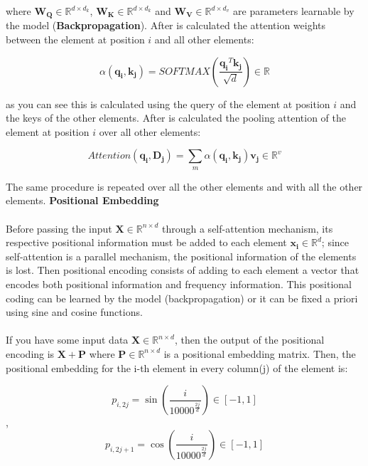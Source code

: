 where $\mathbf{W_{Q}} \in \mathbb{R}^{d \times d_{k}}$, $\mathbf{W_{K}} \in \mathbb{R}^{d \times d_{k}}$ and $\mathbf{W_{V}} \in \mathbb{R}^{d \times d_{v}}$ are parameters learnable by the model (\textbf{Backpropagation}). After is calculated the attention weights between the element at position $i$ and all other elements:

\begin{equation}
     \alpha (\mathbf{q_{i}},\mathbf{k_{j}})=SOFTMAX(\frac{\mathbf{q_{i}}^{T}\mathbf{k_{j}}}{\sqrt{d}}) \in \mathbb{R}
\end{equation}

as you can see this is calculated using the query of the element at position $i$ and the keys of the other elements. After is calculated the pooling attention of the element at position $i$ over all other elements:

\begin{equation}
    Attention(\mathbf{q_{i}},\mathbf{D_{j}})=\sum_{m} \alpha (\mathbf{q_{i}},\mathbf{k_{j}})\mathbf{v_{j}} \in \mathbb{R}^v
\end{equation}

The same procedure is repeated over all the other elements and with all the other elements.
\newpage
\textbf{Positional Embedding}
\\\\
Before passing the input $\mathbf{X} \in \mathbb{R}^{n \times d}$ through a self-attention mechanism, its respective positional information must be added to each element $\mathbf{x_{i}} \in \mathbb{R}^{d}$; since self-attention is a parallel mechanism, the positional information of the elements is lost. Then positional encoding consists of adding to each element a vector that encodes both positional information and frequency information. This positional coding can be learned by the model (backpropagation) or it can be fixed a priori using sine and cosine functions.
\\\\
If you have some input data $\mathbf{X} \in \mathbb{R}^{n \times d}$, then the output of the positional encoding is $\mathbf{X}+\mathbf{P}$ where $\mathbf{P} \in \mathbb{R}^{n \times d}$  is a positional embedding matrix. Then, the positional embedding for the i-th element in every column(j) of the element is: 

\begin{equation}
    p_{i,2j}=\sin(\frac{i}{10000^{\frac{2j}{d}}}) \in [-1,1]
\end{equation},
\begin{equation}
    p_{i,2j+1}=\cos(\frac{i}{10000^{\frac{2j}{d}}}) \in [-1,1]
\end{equation}

